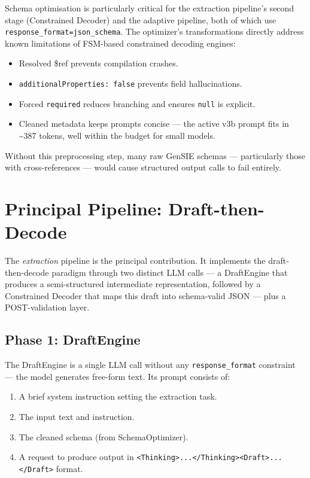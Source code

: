 \documentclass{ceurart}
\begin{document}
Schema optimisation is particularly critical for the extraction pipeline's second stage
(Constrained Decoder) and the adaptive pipeline, both of which use
\texttt{response\_format=json\_schema}.
The optimizer's transformations directly address known limitations of FSM-based
constrained decoding engines:

\begin{itemize}
\item Resolved \$ref prevents compilation crashes.
\item \texttt{additionalProperties: false} prevents field hallucinations.
\item Forced \texttt{required} reduces branching and ensures \texttt{null} is explicit.
\item Cleaned metadata keeps prompts concise --- the active v3b prompt fits in
  {\textasciitilde}387 tokens, well within the budget for small models.
\end{itemize}

Without this preprocessing step, many raw GenSIE schemas --- particularly those with
cross-references --- would cause structured output calls to fail entirely.

\section{Principal Pipeline: Draft-then-Decode}
\label{sec:extraction}

The \emph{extraction} pipeline is the principal contribution.
It implements the draft-then-decode paradigm through two distinct LLM calls --- a
DraftEngine that produces a semi-structured intermediate representation, followed by
a Constrained Decoder that maps this draft into schema-valid JSON --- plus a
POST-validation layer.

\subsection{Phase 1: DraftEngine}

The DraftEngine is a single LLM call without any \texttt{response\_format} constraint
--- the model generates free-form text.
Its prompt consists of:

\begin{enumerate}
\item A brief system instruction setting the extraction task.
\item The input text and instruction.
\item The cleaned schema (from SchemaOptimizer).
\item A request to produce output in \texttt{<Thinking>...</Thinking><Draft>...</Draft>}
  format.
\end{enumerate}
\end{document}
